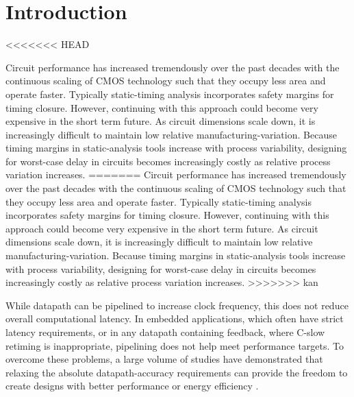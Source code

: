 \documentclass{acm_proc_article-sp}
\begin{document}
\vspace{-1ex}
\vspace{-1ex}

\section{Introduction}
<<<<<<< HEAD

Circuit performance has increased tremendously over the past decades with the continuous scaling of CMOS technology such that they occupy less area and operate faster. Typically static-timing analysis incorporates safety margins for timing closure. However, continuing with this approach could become very expensive in the short term future. As circuit dimensions scale down, it is increasingly difficult to maintain low relative manufacturing-variation. Because timing margins in static-analysis tools increase with process variability, designing for worst-case delay in circuits becomes increasingly costly as relative process variation increases.\vspace{-1.2ex}
=======
Circuit performance has increased tremendously over the past decades with the continuous scaling of CMOS technology such that they occupy less area and operate faster. Typically static-timing analysis incorporates safety margins for timing closure. However, continuing with this approach could become very expensive in the short term future. As circuit dimensions scale down, it is increasingly difficult to maintain low relative manufacturing-variation. Because timing margins in static-analysis tools increase with process variability, designing for worst-case delay in circuits becomes increasingly costly as relative process variation increases.\vspace{-1ex}
>>>>>>> kan

While datapath can be pipelined to increase clock frequency, this does not reduce overall computational latency. In  embedded applications, which often have strict latency requirements, or in any datapath containing feedback, where C-slow retiming is inappropriate, pipelining does not help meet performance targets. To overcome these problems, a large volume of studies have demonstrated that relaxing the absolute datapath-accuracy requirements can provide the freedom to create designs with better performance or energy efficiency \cite{Razor2004,Gupta2013TransCADICS,NonUniformScaling,Undersigned2x2multiplier}.\vspace{-1ex}
\end{document}
